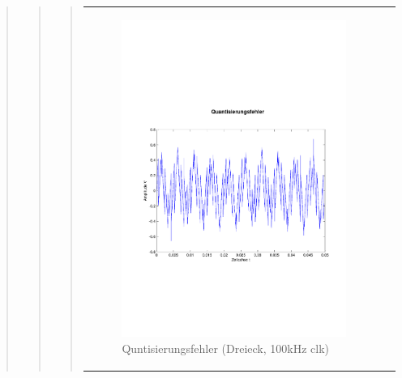 \begin{quote}
\begin{quote}
\begin{quote}
            \begin{center}
                \begin{tabular}{ll}
                
                \hspace{-4cm}
                    
                    \begin{minipage}{0.55\textwidth}
                        \begin{figure}[H]
                            \includegraphics[scale=0.4, trim = 0.8cm 7cm 0.8cm
                            8.5cm, clip]
                            {./Bilder/drei8_Quantisierungsfehler}
                              \caption{Quntisierungsfehler (Dreieck, 100kHz clk)}
                        \end{figure}
                    \end{minipage}
                                  

\end{tabular}
\end{center}
\end{quote}
\end{quote}
\end{quote}
